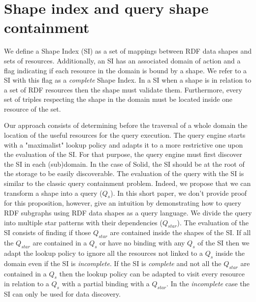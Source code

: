 \section{Shape index and query shape containment}

We define a Shape Index (SI) as a set of mappings between RDF data shapes and sets of resources.
Additionally, an SI has an associated domain of action
and a flag indicating if each resource in the domain is bound by a shape. 
We refer to a SI with this flag as a \emph{complete} Shape Index.
In a SI when a shape is in relation to a set of RDF resources then the shape must validate them.
Furthermore, every set of triples respecting the shape in the domain must be located inside one resource of the set.

Our approach consists of determining before the traversal of a whole domain the location of the useful resources for the query execution.
The query engine starts with a "maximalist" lookup policy and adapts it to a more restrictive one upon the evaluation of the SI.
For that purpose, the query engine must first discover the SI in each (sub)domain.
In the case of Solid, the SI should be at the root of the storage to be easily discoverable.
The evaluation of the query with the SI is similar to the classic query containment problem.
Indeed, we propose that we can transform a shape into a query ($Q_{s}$).
In this short paper, we don't provide proof for this proposition, however, 
\citeauthor{Delva2021} give an intuition by demonstrating how to query RDF subgraphs using RDF data shapes as a query language.
We divide the query into multiple star patterns with their dependencies ($Q_{star}$).
The evaluation of the SI consists of finding if those $Q_{star}$ are contained inside the shapes of the SI.
If all the $Q_{star}$ are contained in a $Q_{s}$ or have no binding with any $Q_{s}$ of the SI
then we adapt the lookup policy to ignore all the resources not linked to a $Q_{s}$ inside the domain even if the SI is \emph{incomplete}.
If the SI is \emph{complete} and not all the $Q_{star}$ are contained in a $Q_{s}$ then the lookup policy can be adapted
to visit every resource in relation to a $Q_{s}$ with a partial binding with a $Q_{star}$. 
In the \emph{incomplete} case the SI can only be used for data discovery.
